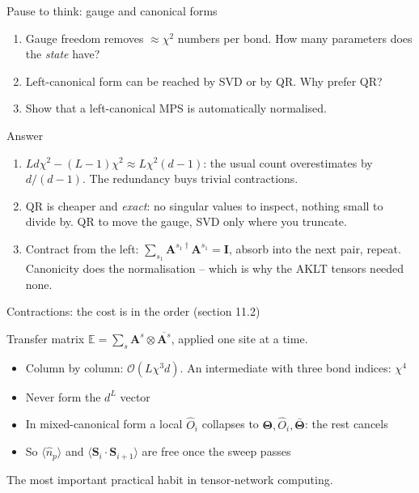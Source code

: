 \documentclass[aspectratio=169,10pt]{beamer}
\newcounter{thinkctr}
\newcommand{\thinkq}[2]{%
  \stepcounter{thinkctr}%
  \begin{tcolorbox}[colback=palewarm,colframe=warm,title={\bfseries Pause to think \#\thethinkctr\hfill\mdseries\small(about #1 min -- discuss with your neighbour)},fonttitle=\bfseries]
  #2
  \end{tcolorbox}}
\newcommand{\thinka}[1]{%
  \begin{tcolorbox}[colback=paleteal,colframe=teal,title={\bfseries Answer to pause \#\thethinkctr}]
  #1
  \end{tcolorbox}}
\newcommand{\bigO}{\mathcal{O}}
\newcommand{\bmat}[1]{\bm{#1}}
\newcommand{\Amat}[1]{\bm{A}^{#1}}
\begin{document}
\begin{frame}{Pause to think: gauge and canonical forms}
  \thinkq{4}{
  \begin{enumerate}
    \item Gauge freedom removes $\approx\chi^2$ numbers per bond. How many parameters does the \emph{state} have?
    \item Left-canonical form can be reached by SVD or by QR. Why prefer QR?
    \item Show that a left-canonical MPS is automatically normalised.
  \end{enumerate}}
\end{frame}

\begin{frame}{Answer}
  \thinka{
  \begin{enumerate}
    \item $Ld\chi^2-(L-1)\chi^2\approx L\chi^2(d-1)$: the usual count overestimates by $d/(d-1)$. The redundancy buys trivial contractions.
    \item QR is cheaper and \emph{exact}: no singular values to inspect, nothing small to divide by. \alert{QR to move the gauge, SVD only where you truncate.}
    \item Contract from the left: $\sum_{s_1}\Amat{s_1\dagger}\Amat{s_1}=\bmat I$, absorb into the next pair, repeat. Canonicity does the normalisation -- which is why the AKLT tensors needed none.
  \end{enumerate}}
\end{frame}

\begin{frame}{Contractions: the cost is in the order (section 11.2)}
  \begin{center}
  \end{center}
  Transfer matrix $\mathbb E=\sum_s\Amat s\otimes\overline{\Amat s}$, applied one site at a time.
  \begin{itemize}
    \item Column by column: $\bigO(L\chi^3d)$. An intermediate with three bond indices: $\chi^4$
    \item Never form the $d^L$ vector
    \item In mixed-canonical form a local $\hat O_i$ collapses to $\bm\Theta,\hat O_i,\bar{\bm\Theta}$: the rest cancels
    \item So $\langle\hat n_p\rangle$ and $\langle\bm S_i\cdot\bm S_{i+1}\rangle$ are free once the sweep passes
  \end{itemize}
  \centering\alert{The most important practical habit in tensor-network computing.}
\end{frame}
\end{document}
